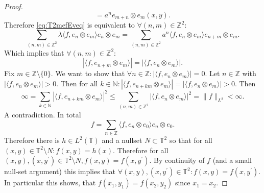\begin{proof}
\begin{equation*}
    = a^n e_{m+n} \otimes e_m (x,y).
  \end{equation*}
  Therefore \cref{eq:T2mefEveq} is equivalent to $\forall (n,m) \in \mathbb{Z}^2$:
  \begin{equation*}
    \sum_{(n,m) \in \mathbb{Z}^2} \lambda \langle f, e_n \otimes e_m \rangle e_n \otimes e_m = 
    \sum_{(n,m) \in \mathbb{Z}^2} a^n \langle f, e_n \otimes e_m \rangle e_{n+m} \otimes e_m.
  \end{equation*}
  Which implies that
$\forall (n,m) \in \mathbb{Z}^2$:
\begin{equation*}
  |\langle f, e_{n+m} \otimes e_m \rangle|  = |\langle f, e_n \otimes e_m \rangle|.
\end{equation*}
  Fix $m \in \mathbb{Z} \setminus \{0\}$.
  We want to show that $\forall n \in \mathbb{Z}: |\langle f, e_n \otimes e_m \rangle| = 0$.
  Let $n \in \mathbb{Z}$ with $|\langle f, e_n \otimes e_m \rangle| > 0$.
  Then for all $k \in \mathbb{N}: |\langle f, e_{n+km} \otimes e_m \rangle| = |\langle f, e_n \otimes e_m \rangle|>0$.
  Then
  \begin{equation*}
    \infty = \sum_{k \in \mathbb{N} } |\langle f, e_{n+km} \otimes e_m \rangle|^2
    \leq   \sum_{(n,m) \in \mathbb{Z}^2} |\langle f, e_{n} \otimes e_m \rangle|^2 
    =\|f\|_{L^2} < \infty.
  \end{equation*}
  A contradiction.
  In total
  \begin{equation*}
    f = \sum_{n \in \mathbb{Z}} \langle f, e_n \otimes e_0 \rangle e_n \otimes e_0.
  \end{equation*}
  Therefore there is $h \in L^2(\mathbb{T})$ and a nullset $N \subset \mathbb{T}^2$ so that for all $(x,y) \in \mathbb{T}^2 \setminus N : f(x,y) = h(x)$.
  Therefore for all  $(x,y) , (x,y^\prime) \in \mathbb{T}^2 \setminus N , f(x,y) = f(x,y^\prime)$. 
  By continuity of $f$ (and a small null-set argument) this implies that $\forall (x,y), (x,y^\prime) \in \mathbb{T}^2 : f(x,y) = f(x,y^\prime)$.
  In particular this shows, that $f(x_1,y_1) = f(x_2, y_2)$ since $x_1 = x_2$.
\end{proof}

